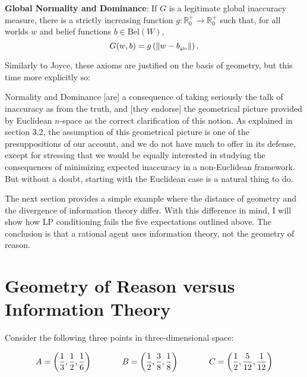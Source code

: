 \documentclass[11pt]{article}
\begin{document}
\begin{quotex}
  \textbf{Global Normality and Dominance}: If $G$ is a legitimate
  global inaccuracy measure, there is a strictly increasing function
  $g:\mathbb{R}^{+}_{0}\rightarrow\mathbb{R}^{+}_{0}$ such that, for
  all worlds $w$ and belief functions $b\in{}\mbox{Bel}(W)$,
  \begin{equation}
    \label{eq:e5}
  G(w,b)=g\left(\|w-b_{\mbox{{\tiny glo}}}\|\right).
  \end{equation}
\end{quotex}

Similarly to Joyce, these axioms are justified on the basis of
geometry, but this time more explicitly so:

\begin{quotex}
  Normality and Dominance [are] a consequence of taking seriously the
  talk of inaccuracy as  from the truth, and [they
  endorse] the geometrical picture provided by Euclidean $n$-space as
  the correct clarification of this notion. As explained in section
  3.2, the assumption of this geometrical picture is one of the
  presuppositions of our account, and we do not have much to offer in
  its defense, except for stressing that we would be equally
  interested in studying the consequences of minimizing expected
  inaccuracy in a non-Euclidean framework. But without a doubt,
  starting with the Euclidean case is a natural thing to do.
\end{quotex}

The next section provides a simple example where the distance of
geometry and the divergence of information theory differ. With this
difference in mind, I will show how LP conditioning fails the five
expectations outlined above. The conclusion is that a rational agent
uses information theory, not the geometry of reason.

\section{Geometry of Reason versus Information Theory}
\label{grit}

Consider the following three points in three-dimensional space: 

\begin{equation}
  \label{eq:e6}
    A=\left(\frac{1}{3},\frac{1}{2},\frac{1}{6}\right) \hspace{.5in}
    B=\left(\frac{1}{2},\frac{3}{8},\frac{1}{8}\right)  \hspace{.5in}
    C=\left(\frac{1}{2},\frac{5}{12},\frac{1}{12}\right)
\end{equation}
\end{document}
